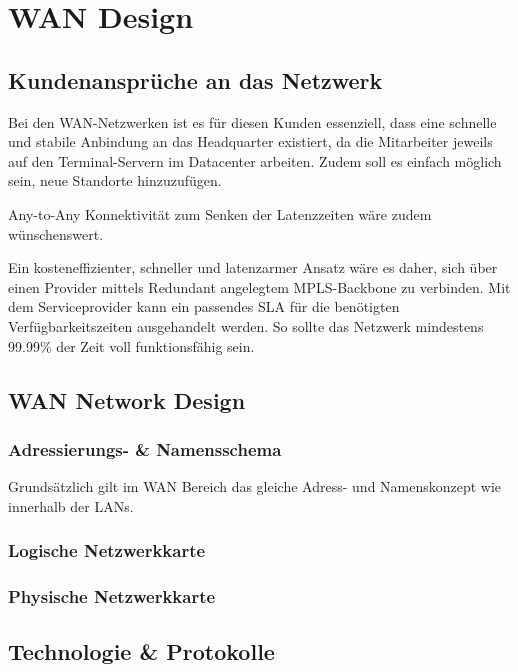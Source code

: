 \section{WAN Design}

\subsection{Kundenansprüche an das Netzwerk}

Bei den WAN-Netzwerken ist es für diesen Kunden essenziell, dass eine schnelle und stabile Anbindung an das Headquarter existiert, da die Mitarbeiter jeweils auf den Terminal-Servern im Datacenter arbeiten. Zudem soll es einfach möglich sein, neue Standorte hinzuzufügen.

Any-to-Any Konnektivität zum Senken der Latenzzeiten wäre zudem wünschenswert.

Ein kosteneffizienter, schneller und latenzarmer Ansatz wäre es daher, sich über einen Provider mittels Redundant angelegtem MPLS-Backbone zu verbinden. Mit dem Serviceprovider kann ein passendes SLA für die benötigten Verfügbarkeitszeiten ausgehandelt werden. So sollte das Netzwerk mindestens 99.99\% der Zeit voll funktionsfähig sein.

\subsection{WAN Network Design}

\subsubsection{Adressierungs- \& Namensschema}

Grundsätzlich gilt im WAN Bereich das gleiche Adress- und Namenskonzept wie innerhalb der LANs.

\subsubsection{Logische Netzwerkkarte}
\subsubsection{Physische Netzwerkkarte}

\subsection{Technologie \& Protokolle}
